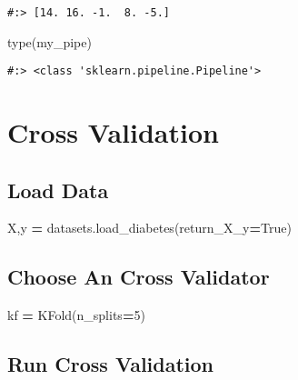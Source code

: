 \documentclass[
]{book}
\newenvironment{Shaded}{\begin{snugshade}}{\end{snugshade}}
\newcommand{\BuiltInTok}[1]{#1}
\newcommand{\DecValTok}[1]{\textcolor[rgb]{0.06,0.06,0.06}{#1}}
\newcommand{\NormalTok}[1]{#1}
\newcommand{\OperatorTok}[1]{\textcolor[rgb]{0.43,0.43,0.43}{\textbf{#1}}}
\newcommand{\VariableTok}[1]{\textcolor[rgb]{0,0,0}{#1}}
\begin{document}
\begin{verbatim}
#:> [14. 16. -1.  8. -5.]
\end{verbatim}

\begin{Shaded}
\begin{Highlighting}[]
\BuiltInTok{type}\NormalTok{(my\_pipe)}
\end{Highlighting}
\end{Shaded}

\begin{verbatim}
#:> <class 'sklearn.pipeline.Pipeline'>
\end{verbatim}

\hypertarget{cross-validation}{%
\section{Cross Validation}\label{cross-validation}}

\hypertarget{load-data}{%
\subsection{Load Data}\label{load-data}}

\begin{Shaded}
\begin{Highlighting}[]
\NormalTok{X,y }\OperatorTok{=}\NormalTok{ datasets.load\_diabetes(return\_X\_y}\OperatorTok{=}\VariableTok{True}\NormalTok{)}
\end{Highlighting}
\end{Shaded}

\hypertarget{choose-an-cross-validator}{%
\subsection{Choose An Cross Validator}\label{choose-an-cross-validator}}

\begin{Shaded}
\begin{Highlighting}[]
\NormalTok{kf }\OperatorTok{=}\NormalTok{ KFold(n\_splits}\OperatorTok{=}\DecValTok{5}\NormalTok{)}
\end{Highlighting}
\end{Shaded}

\hypertarget{run-cross-validation}{%
\subsection{Run Cross Validation}\label{run-cross-validation}}
\end{document}
